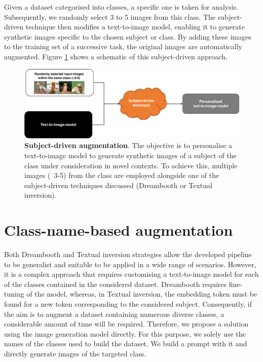 Given a dataset categorised into classes, a specific one is taken for analysis. Subsequently, we randomly select 3 to 5 images from this class. The subject-driven technique then modifies a text-to-image model, enabling it to generate synthetic images specific to the chosen subject or class. By adding these images to the training set of a successive task, the original images are automatically augmented. Figure \ref{fig:sdaug} shows a schematic of this subject-driven approach.

\begin{figure}
    \centering
    \includegraphics[width=1\textwidth]{Pictures/subject-driven-augmentation.pdf}
    \caption{\textbf{Subject-driven augmentation}. The objective is to personalise a text-to-image model to generate synthetic images of a subject of the class under consideration in novel contexts. To achieve this, multiple images (~3-5) from the class are employed  alongside one of the subject-driven techniques discussed (Dreambooth or Textual inversion).}
    \label{fig:sdaug}
\end{figure}

\section{Class-name-based augmentation} \label{sec: cnbAugmentation}

Both Dreambooth and Textual inversion strategies allow the developed pipeline to be generalist and suitable to be applied in a wide range of scenarios. However, it is a complex approach that requires customising a text-to-image model for each of the classes contained in the considered dataset. Dreambooth requires fine-tuning of the model, whereas, in Textual inversion, the embedding token must be found for a new token corresponding to the considered subject. Consequently, if the aim is to augment a dataset containing numerous diverse classes, a considerable amount of time will be required. Therefore, we propose a solution using the image generation model directly. For this purpose, we solely use the names of the classes used to build the dataset. We build a prompt with it and directly generate images of the targeted class.

